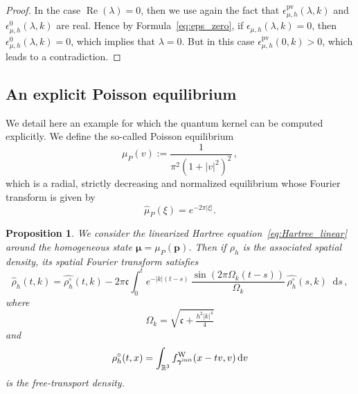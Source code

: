 \documentclass[a4paper,12pt]{amsart} %
\theoremstyle{plain}
\newtheorem{prop}[thm]{Proposition}
\theoremstyle{definition}
\newcommand		{\RR}		{\mathbb R}			%
\newcommand		{\R}		{\RR}
\newcommand		{\Rd}		{\R^3}
\newcommand		{\lt}			{\left}				%
\newcommand		{\rt}			{\right}			%
\renewcommand	{\(}			{\lt(}
\renewcommand	{\)}			{\rt)}
\newcommand		{\n}[1]			{\lt\lvert{#1}\rt\rvert}	%
\newcommand		{\sabs}[1]		{\lvert{#1}\rvert}
\renewcommand		{\d}		{\mathop{}\!\mathrm{d}}		%
\DeclareMathOperator{\re}		{Re}				%
\renewcommand	{\Re}[1]		{\re\!\( #1 \)}		%
\newcommand		{\intd}			{\int_{\Rd}}
\newcommand		{\init}			{\mathrm{init}}
\newcommand	{\h}			{h}
\newcommand		{\opgam}		{{\boldsymbol{\gamma}}}
\newcommand		{\op}			{\opgam}	%
\newcommand		{\opmu}			{\boldsymbol{\mu}}	%
\newcommand	 {\Wigner}[1]		{f^\textnormal{W}_{#1}}
\newcommand		{\opp}			{\boldsymbol{p}}
\newcommand		{\CK}			{\mathfrak{c}}	%
\begin{document}
\begin{proof}
		In the case $\Re{\lambda} = 0$, then we use again the fact that $\epsilon_{\mu,\h}^\text{pv}(\lambda,k)$ 
		and $\epsilon_{\mu,\h}^0(\lambda,k)$ are real. Hence by Formula~\eqref{eq:eps_zero}, if $\epsilon_{\mu,\h}(\lambda,k) = 0$, then $\epsilon_{\mu,\h}^0(\lambda,k) = 0$, which implies that $\lambda = 0$. But in this case $\epsilon_{\mu,\h}^\text{pv}(0,k) > 0$, which leads to a contradiction.
	\end{proof}




\subsection{An explicit Poisson equilibrium}\label{sec:explicit-Poisson-equilibrium}


	We detail here an example for which the quantum kernel can be computed explicitly. We define the so-called Poisson equilibrium
	\begin{equation}\label{Poisson-equilibrium}
		\mu_P(v):=\frac{1}{\pi^2(1+\sabs{v}^2)^2} \, ,
	\end{equation}
	which is a radial, strictly decreasing and normalized equilibrium whose Fourier transform is given by
	\begin{equation}\label{eq:mu_P_Fourier}
		\widehat{\mu}_P(\xi) = e^{-2\pi \n{\xi}} .
	\end{equation}

	\begin{prop}\label{prop:Green-explicit-solution}
		We consider the linearized Hartree equation~\eqref{eq:Hartree_linear} around the homogeneous state $\opmu=\mu_P(\opp)$. Then if $\rho_\h$ is the associated spatial density, its spatial Fourier transform satisfies
		\begin{equation}\label{eq:Green-explicit-solution}
			\widehat\rho_\h(t,k) = \widehat{\rho_\h^\circ}(t,k)- 2\pi\CK \int_0^t e^{-\n{k}(t-s)} \, \frac{\sin\!\lt(2\pi\Omega_k\lt(t-s\rt)\rt)}{\Omega_k} \, \widehat{\rho_\h^\circ}(s,k) \d s \, ,
		\end{equation}
		where
		\begin{equation*}
			\Omega_k=\sqrt{\CK+\tfrac{h^2\n{k}^4}{4}}
		\end{equation*}
		and
		\begin{equation*}
			\rho_\h^\circ(t,x) =\intd \Wigner{\op^\init}(x-tv,v) \d v
		\end{equation*}
		is the free-transport density.
	\end{prop}
	
\end{document}
